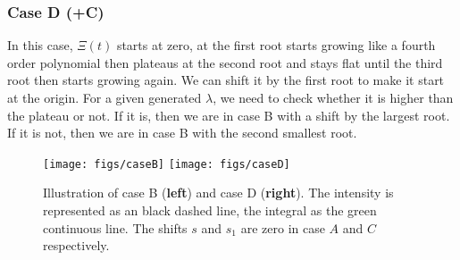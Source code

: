 \subsubsection*{Case D (+C)}
In this case, $\Xi(t)$ starts at zero, at the first root starts growing like a fourth order polynomial then plateaus at the second root and stays flat until the third root then starts growing again. We can shift it by the first root to make it start at the origin. For a given generated $\lambda$, we need to check whether it is higher than the plateau or not. If it is, then we are in case B with a shift by the largest root. If it is not, then we are in case B with the second smallest root.

\begin{figure}[!h]
\center
\texttt{[image: figs/caseB]}
\texttt{[image: figs/caseD]}
\caption{\label{fig:caseB+D}Illustration of case B (\textbf{left}) and case D (\textbf{right}). The intensity is represented as an black dashed line, the integral as the green continuous line. The shifts $s$ and $s_{1}$ are zero in case $A$ and $C$ respectively. }
\end{figure}


